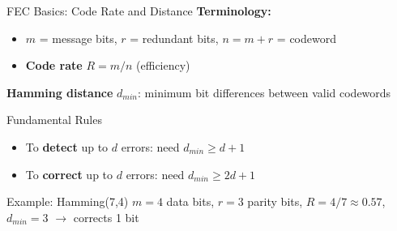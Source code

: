 \documentclass[aspectratio=169,11pt]{beamer}
\begin{document}
\begin{frame}{FEC Basics: Code Rate and Distance}
    \textbf{Terminology:}
    \begin{itemize}
        \item $m$ = message bits, $r$ = redundant bits, $n = m + r$ = codeword
        \item \textbf{Code rate} $R = m/n$ (efficiency)
    \end{itemize}
    
    \vspace{0.2cm}
    \textbf{Hamming distance} $d_{min}$: minimum bit differences between valid codewords
    
    \vspace{0.2cm}
    \begin{block}{Fundamental Rules}
        \begin{itemize}
            \item To \textbf{detect} up to $d$ errors: need $d_{min} \geq d + 1$
            \item To \textbf{correct} up to $d$ errors: need $d_{min} \geq 2d + 1$
        \end{itemize}
    \end{block}
    
    \begin{exampleblock}{Example: Hamming(7,4)}
        $m=4$ data bits, $r=3$ parity bits, $R = 4/7 \approx 0.57$, $d_{min}=3$ $\rightarrow$ corrects 1 bit
    \end{exampleblock}
\end{frame}
\end{document}
